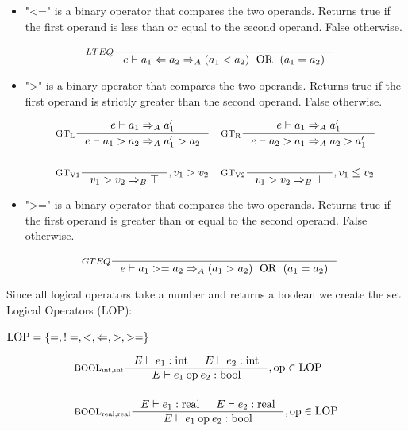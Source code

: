 \begin{itemize}
\item "<=" is a binary operator that compares the two operands. Returns true if the first operand is less than or equal to the second operand. False otherwise.

\begin{align*}
&\inference[$LTEQ$]{}
                    {e \vdash a_1 <= a_2 \Rightarrow_A (a_1 < a_2) \Tor (a_1 = a_2)}
\end{align*}

\item ">" is a binary operator that compares the two operands. Returns true if the first operand is strictly greater than the second operand. False otherwise.

\begin{align*}
&\inference[$\text{GT}_\text{L}$]{e \vdash a_1 \Rightarrow_A a_1'}
                    {e \vdash a_1 > a_2 \Rightarrow_A a_1' > a_2}
&
&\inference[$\text{GT}_\text{R}$]{e \vdash a_1 \Rightarrow_A a_1'}
                    {e \vdash a_2 > a_1 \Rightarrow_A a_2 > a_1'}
\\\\
&\inference[$\text{GT}_\text{V1}$]{}
                    {v_1 > v_2 \Rightarrow_B \top}
                    {, v_1 > v_2}
&
&\inference[$\text{GT}_\text{V2}$]{}
                    {v_1 > v_2 \Rightarrow_B \bot}
                    {, v_1 \leq v_2}
\end{align*}

\item ">=" is a binary operator that compares the two operands. Returns true if the first operand is greater than or equal to the second operand. False otherwise.

\begin{align*}
&\inference[$GTEQ$]{}
                    {e \vdash a_1 >= a_2 \Rightarrow_A (a_1 > a_2) \Tor (a_1 = a_2)}
\end{align*}
\end{itemize}

Since all logical operators take a number and returns a boolean we create the set Logical Operators (LOP):
\begin{center}
$\text{LOP} = \left\{ {=, !=, <, <=, >, >=} \right\}$	
\end{center}

\begin{align*}
&\inference[$\text{BOOL}_{\Tint,\Tint}$]{\Tenv e_1 : \Tint & 
                       \Tenv e_2 : \Tint}
                    {\Tenv e_1 \mathbin{\text{op}} e_2 : \Tbool}, \text{op} \in \Tlop
\\\\
&\inference[$\text{BOOL}_{\Treal,\Treal}$]{\Tenv e_1 : \Treal &
                       \Tenv e_2 : \Treal}
                    {\Tenv e_1 \mathbin{\text{op}} e_2 : \Tbool}, \text{op} \in \Tlop
\end{align*}

